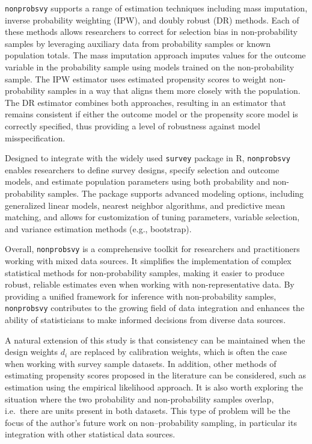 \documentclass[
]{jss}
\begin{document}
\texttt{nonprobsvy} supports a range of estimation techniques including
mass imputation, inverse probability weighting (IPW), and doubly robust
(DR) methods. Each of these methods allows researchers to correct for
selection bias in non-probability samples by leveraging auxiliary data
from probability samples or known population totals. The mass imputation
approach imputes values for the outcome variable in the probability
sample using models trained on the non-probability sample. The IPW
estimator uses estimated propensity scores to weight non-probability
samples in a way that aligns them more closely with the population. The
DR estimator combines both approaches, resulting in an estimator that
remains consistent if either the outcome model or the propensity score
model is correctly specified, thus providing a level of robustness
against model misspecification.

Designed to integrate with the widely used \texttt{survey} package in R,
\texttt{nonprobsvy} enables researchers to define survey designs,
specify selection and outcome models, and estimate population parameters
using both probability and non-probability samples. The package supports
advanced modeling options, including generalized linear models, nearest
neighbor algorithms, and predictive mean matching, and allows for
customization of tuning parameters, variable selection, and variance
estimation methods (e.g., bootstrap).

Overall, \texttt{nonprobsvy} is a comprehensive toolkit for researchers
and practitioners working with mixed data sources. It simplifies the
implementation of complex statistical methods for non-probability
samples, making it easier to produce robust, reliable estimates even
when working with non-representative data. By providing a unified
framework for inference with non-probability samples,
\texttt{nonprobsvy} contributes to the growing field of data integration
and enhances the ability of statisticians to make informed decisions
from diverse data sources.

A natural extension of this study is that consistency can be maintained
when the design weights \(d_i\) are replaced by calibration weights,
which is often the case when working with survey sample datasets. In
addition, other methods of estimating propensity scores proposed in the
literature can be considered, such as estimation using the empirical
likelihood approach. It is also worth exploring the situation where the
two probability and non-probability samples overlap, i.e.~there are
units present in both datasets. This type of problem will be the focus
of the author's future work on non--probability sampling, in particular
its integration with other statistical data sources.


\end{document}
